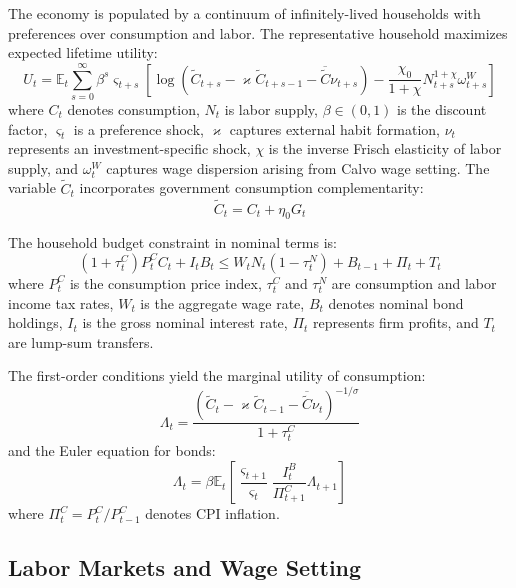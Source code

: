 \documentclass[12pt]{article}
\begin{document}
The economy is populated by a continuum of infinitely-lived households with preferences over consumption and labor. The representative household maximizes expected lifetime utility:
\begin{equation}
U_t = \mathbb{E}_t \sum_{s=0}^{\infty} \beta^s \varsigma_{t+s} \left[ \log(\tilde{C}_{t+s} - \varkappa \tilde{C}_{t+s-1} - \overline{\tilde{C}} \nu_{t+s}) - \frac{\chi_0}{1+\chi} N_{t+s}^{1+\chi} \omega_{t+s}^W \right]
\end{equation}
where $C_t$ denotes consumption, $N_t$ is labor supply, $\beta \in (0,1)$ is the discount factor, $\varsigma_t$ is a preference shock, $\varkappa$ captures external habit formation, $\nu_t$ represents an investment-specific shock, $\chi$ is the inverse Frisch elasticity of labor supply, and $\omega_t^W$ captures wage dispersion arising from Calvo wage setting. The variable $\tilde{C}_t$ incorporates government consumption complementarity:
\begin{equation}
\tilde{C}_t = C_t + \eta_0 G_t
\end{equation}

The household budget constraint in nominal terms is:
\begin{equation}
(1 + \tau_t^C) P_t^C C_t + I_t B_t \leq W_t N_t (1 - \tau_t^N) + B_{t-1} + \Pi_t + T_t
\end{equation}
where $P_t^C$ is the consumption price index, $\tau_t^C$ and $\tau_t^N$ are consumption and labor income tax rates, $W_t$ is the aggregate wage rate, $B_t$ denotes nominal bond holdings, $I_t$ is the gross nominal interest rate, $\Pi_t$ represents firm profits, and $T_t$ are lump-sum transfers.

The first-order conditions yield the marginal utility of consumption:
\begin{equation}\label{eq:lambda}
\Lambda_t = \frac{(\tilde{C}_t - \varkappa \tilde{C}_{t-1} - \overline{\tilde{C}} \nu_t)^{-1/\sigma}}{1 + \tau_t^C}
\end{equation}
and the Euler equation for bonds:
\begin{equation}\label{eq:euler}
\Lambda_t = \beta \mathbb{E}_t \left[ \frac{\varsigma_{t+1}}{\varsigma_t} \frac{I_t^B}{\Pi_{t+1}^C} \Lambda_{t+1} \right]
\end{equation}
where $\Pi_t^C = P_t^C / P_{t-1}^C$ denotes CPI inflation.

\subsection{Labor Markets and Wage Setting}
\end{document}
